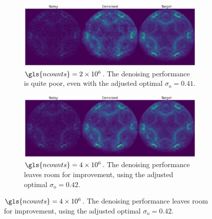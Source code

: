 \begin{figure}
    \centering
    \begin{subfigure}[b]{1\linewidth}
        \centering
        \includegraphics[width=1\linewidth]{images/noisy_denoised_ref_2M_avg_bm3d.pdf}
        \caption{$\gls{ncounts}=\num{2e6}$. The denoising performance is quite poor, even with the adjusted optimal $\sigma_{\text{o}}=0.41$.}
        \label{fig:noisy-denoised-ref-2M-avg-bm3d}
    \end{subfigure}
    \begin{subfigure}[b]{1\linewidth}
        \centering
        \includegraphics[width=1\linewidth]{images/noisy_denoised_ref_4M_avg_bm3d.pdf}
        \caption{$\gls{ncounts}=\num{4e6}$. The denoising performance leaves room for improvement, using the adjusted optimal $\sigma_{\text{o}}=0.42$.}
        \label{fig:noisy-denoised-ref-4M-avg-bm3d}
    \end{subfigure}


\end{figure}
